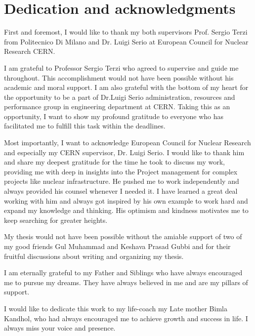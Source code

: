 %
%

\chapter*{Dedication and acknowledgments}
\begin{SingleSpace}
First and foremost, I would like to thank my both supervisors Prof. Sergio Terzi from Politecnico Di Milano and Dr. Luigi Serio at European Council for Nuclear Research CERN. 

I am grateful to Professor Sergio Terzi who agreed to supervise and guide me throughout. This accomplishment would not have been possible without his academic and moral support. I am also grateful with the bottom of my heart for the opportunity to be a part of Dr.Luigi Serio administration, resources and performance group in engineering department at CERN. Taking this as an opportunity, I want to show my profound gratitude to everyone who has facilitated me to fulfill this task within the deadlines. 

Most importantly, I want to acknowledge European Council for Nuclear Research and especially my CERN supervisor, Dr. Luigi Serio.  I would like to thank him and share my deepest gratitude for the time he took to discuss my work, providing me with deep in insights into the Project management for complex projects like nuclear infrastructure. He pushed me to work independently and always provided his counsel whenever I needed it. I have learned a great deal working with him and always got inspired by his own example to work hard and expand my knowledge and thinking. His optimism and kindness motivates me to keep searching for greater heights.

My thesis would not have been possible without the amiable support of two of my good friends Gul Muhammad and Keshava Prasad Gubbi and for their fruitful discussions about writing and organizing my thesis. 

I am eternally grateful to my Father and Siblings who have always encouraged me to pursue my dreams. They have always believed in me and are my pillars of support.

I would like to dedicate this work to my life-coach my Late mother Bimla Kandhol, who had always encouraged me to achieve growth and success in life. I always miss your voice and presence. 

\end{SingleSpace}
\clearpage